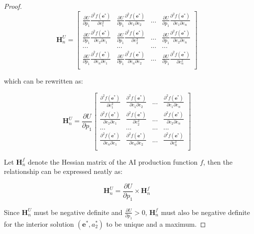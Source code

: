 \documentclass[11pt]{article}
\theoremstyle{definition}
\theoremstyle{remark}
\begin{document}
\begin{proof}
$$\mathbf{H}^U_n=\begin{bmatrix}
\frac{\partial U}{\partial p_1}\frac{\partial^2 f(\mathbf{e}^*)}{\partial e_1^2} & \frac{\partial U}{\partial p_1}\frac{\partial^2 f(\mathbf{e}^*)}{\partial e_1\partial e_2} & ... & \frac{\partial U}{\partial p_1}\frac{\partial^2 f(\mathbf{e}^*)}{\partial e_1\partial e_n}\\
\frac{\partial U}{\partial p_1}\frac{\partial^2 f(\mathbf{e}^*)}{\partial e_2\partial e_1} & \frac{\partial U}{\partial p_1}\frac{\partial^2 f(\mathbf{e}^*)}{\partial e_2^2} & ... & \frac{\partial U}{\partial p_1}\frac{\partial^2 f(\mathbf{e}^*)}{\partial e_2\partial e_n}\\
... & ... & ... & ...\\
\frac{\partial U}{\partial p_1}\frac{\partial^2 f(\mathbf{e}^*)}{\partial e_n\partial e_1} & \frac{\partial U}{\partial p_1}\frac{\partial^2 f(\mathbf{e}^*)}{\partial e_n\partial e_2} & ... & \frac{\partial U}{\partial p_1}\frac{\partial^2 f(\mathbf{e}^*)}{\partial e_n^2}\\
\end{bmatrix}$$

which can be rewritten as:

$$\mathbf{H}^U_n=\frac{\partial U}{\partial p_1}\begin{bmatrix}
\frac{\partial^2 f(\mathbf{e}^*)}{\partial e_1^2} & \frac{\partial^2 f(\mathbf{e}^*)}{\partial e_1\partial e_2} & ... & \frac{\partial^2 f(\mathbf{e}^*)}{\partial e_1\partial e_n}\\
\frac{\partial^2 f(\mathbf{e}^*)}{\partial e_2\partial e_1} & \frac{\partial^2 f(\mathbf{e}^*)}{\partial e_2^2} & ... & \frac{\partial^2 f(\mathbf{e}^*)}{\partial e_2\partial e_n}\\
... & ... & ... & ...\\
\frac{\partial^2 f(\mathbf{e}^*)}{\partial e_n\partial e_1} & \frac{\partial^2 f(\mathbf{e}^*)}{\partial e_n\partial e_2} & ... & \frac{\partial^2 f(\mathbf{e}^*)}{\partial e_n^2}\\
\end{bmatrix}$$

Let $\mathbf{H}^f_n$ denote the Hessian matrix of the AI production function $f$, then the relationship can be expressed neatly as:

$$\mathbf{H}^U_n=\frac{\partial U}{\partial p_1}\times\mathbf{H}^f_n$$

Since $\mathbf{H}^U_n$ must be negative definite and $\frac{\partial U}{\partial p_1}>0$, $\mathbf{H}^f_n$ must also be negative definite for the interior solution $(\mathbf{e}^*,a^*_2)$ to be unique and a maximum.
\end{proof}
\end{document}
